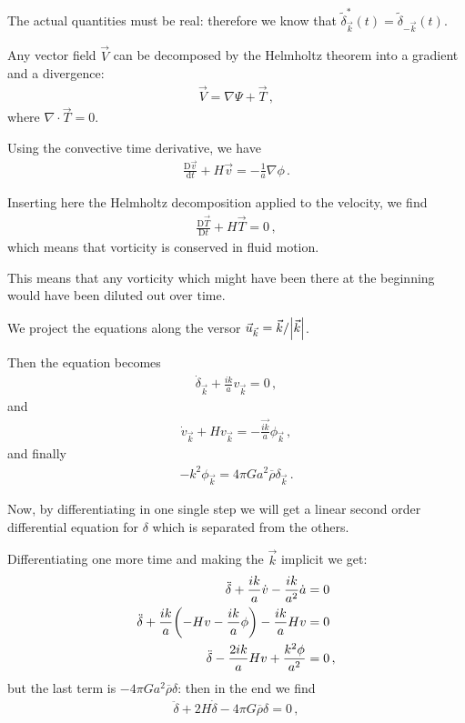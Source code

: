 \documentclass[main.tex]{subfiles}
\begin{document}
The actual quantities must be real: therefore we know that \(\widetilde{\delta}^{*}_{\vec{k}} (t) = \widetilde{\delta}_{-\vec{k}} (t)\).

Any vector field \(\vec{V}\) can be decomposed by the Helmholtz theorem into a gradient and a divergence: 
%
\begin{align}
  \vec{V} = \nabla \Psi + \vec{T}
\,,
\end{align}
%
where \(\nabla \cdot \vec{T} = 0\).

Using the convective time derivative, we have 
%
\begin{align}
  \frac{\mathrm{D} \vec{v}}{\mathrm{d}t} 
  + H \vec{v} = - \frac{1}{a} \nabla \phi 
\,.
\end{align}

Inserting here the Helmholtz decomposition applied to the velocity, we find 
%
\begin{align}
  \frac{\mathrm{D} \vec{T}}{\mathrm{D}t} + H \vec{T} = 0
\,,
\end{align}
%
which means that vorticity is conserved in fluid motion. 

This means that any vorticity which might have been there at the beginning would have been diluted out over time.

We project the equations along the versor \(\vec{u}_{\vec{k}} = \vec{k} / \abs{\vec{k}}\). 

Then the equation becomes 
%
\begin{align}
  \dot{\delta}_{\vec{k}} + \frac{ik}{a} v_{\vec{k}} =0
\,,
\end{align}
%
and 
%
\begin{align}
  \dot{v}_{\vec{k}} + H v_{\vec{k}} = - \frac{\vec{ik}}{a} \phi_{\vec{k}}
  \,,
\end{align}
%
and finally 
%
\begin{align}
  - k^2 \phi_{\vec{k}} = 4 \pi G a^2 \overline{\rho} \delta_{\vec{k}}
\,.
\end{align}

Now, by differentiating in one single step we will get a linear second order differential equation for \(\delta \) which is separated from the others. 

Differentiating one more time and making the \(\vec{k}\) implicit we get: 
%
\begin{align}
  \ddot{\delta} + \frac{ik}{a} \dot{v} - \frac{ik}{a^2}\dot{a} &= 0  \\
  \ddot{\delta} + \frac{ik}{a} \qty(-Hv - \frac{ik}{a} \phi ) - \frac{ik}{a} Hv &=0  \\
  \ddot{\delta} - \frac{2ik}{a} Hv + \frac{k^2 \phi }{a^2} &=0
\,,
\end{align}
%
but the last term is \(- 4 \pi G a^2 \overline{\rho} \delta \): then in the end we find 
%
\begin{align}
  \ddot{\delta} + 2 H \dot{\delta} - 4 \pi G \overline{\rho} \delta = 0 
\,,
\end{align}
%
\end{document}
